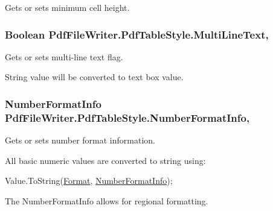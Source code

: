 Gets or sets minimum cell height. 

\subsubsection[{\texorpdfstring{Multi\+Line\+Text}{MultiLineText}}]{\setlength{\rightskip}{0pt plus 5cm}Boolean Pdf\+File\+Writer.\+Pdf\+Table\+Style.\+Multi\+Line\+Text\hspace{0.3cm}{\ttfamily [get]}, {\ttfamily [set]}}\hypertarget{class_pdf_file_writer_1_1_pdf_table_style_a887b6da46156233a3d9c62718deab2f1}{}\label{class_pdf_file_writer_1_1_pdf_table_style_a887b6da46156233a3d9c62718deab2f1}


Gets or sets multi-\/line text flag. 

String value will be converted to text box value. 
\subsubsection[{\texorpdfstring{Number\+Format\+Info}{NumberFormatInfo}}]{\setlength{\rightskip}{0pt plus 5cm}Number\+Format\+Info Pdf\+File\+Writer.\+Pdf\+Table\+Style.\+Number\+Format\+Info\hspace{0.3cm}{\ttfamily [get]}, {\ttfamily [set]}}\hypertarget{class_pdf_file_writer_1_1_pdf_table_style_a2beb6ef95dd078268bb988549e999f8a}{}\label{class_pdf_file_writer_1_1_pdf_table_style_a2beb6ef95dd078268bb988549e999f8a}


Gets or sets number format information. 

All basic numeric values are converted to string using\+: 


\begin{DoxyCode}
Value.ToString(\hyperlink{class_pdf_file_writer_1_1_pdf_table_style_af66d0e0252bfaf5f4ae226e43d70f093}{Format}, \hyperlink{class_pdf_file_writer_1_1_pdf_table_style_a2beb6ef95dd078268bb988549e999f8a}{NumberFormatInfo});
\end{DoxyCode}
 

The Number\+Format\+Info allows for regional formatting. 

